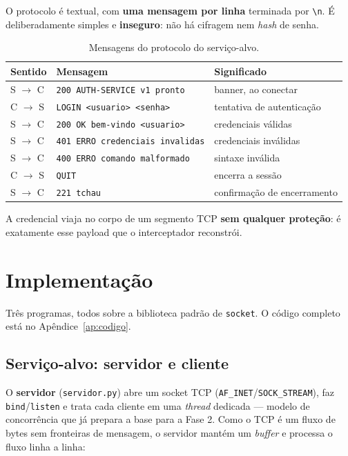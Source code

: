 \documentclass[11pt,a4paper]{article}
\begin{document}
O protocolo é textual, com \textbf{uma mensagem por linha} terminada por
\texttt{\textbackslash n}. É deliberadamente simples e \textbf{inseguro}: não há
cifragem nem \textit{hash} de senha.

\begin{table}[h]
\centering
\begin{tabular}{@{}llp{6.8cm}@{}}
\toprule
\textbf{Sentido} & \textbf{Mensagem} & \textbf{Significado} \\
\midrule
S $\rightarrow$ C & \texttt{200 AUTH-SERVICE v1 pronto} & banner, ao conectar \\
C $\rightarrow$ S & \texttt{LOGIN <usuario> <senha>} & tentativa de autenticação \\
S $\rightarrow$ C & \texttt{200 OK bem-vindo <usuario>} & credenciais válidas \\
S $\rightarrow$ C & \texttt{401 ERRO credenciais invalidas} & credenciais inválidas \\
S $\rightarrow$ C & \texttt{400 ERRO comando malformado} & sintaxe inválida \\
C $\rightarrow$ S & \texttt{QUIT} & encerra a sessão \\
S $\rightarrow$ C & \texttt{221 tchau} & confirmação de encerramento \\
\bottomrule
\end{tabular}
\caption{Mensagens do protocolo do serviço-alvo.}
\label{tab:protocolo}
\end{table}

A credencial viaja no corpo de um segmento TCP \textbf{sem qualquer proteção}: é
exatamente esse payload que o interceptador reconstrói.

\section{Implementação}

Três programas, todos sobre a biblioteca padrão de \texttt{socket}. O código
completo está no Apêndice~\ref{ap:codigo}.

\subsection{Serviço-alvo: servidor e cliente}

O \textbf{servidor} (\texttt{servidor.py}) abre um socket TCP
(\texttt{AF\_INET}/\texttt{SOCK\_STREAM}), faz \texttt{bind}/\texttt{listen} e
trata cada cliente em uma \textit{thread} dedicada — modelo de concorrência que
já prepara a base para a Fase 2. Como o TCP é um fluxo de bytes sem fronteiras de
mensagem, o servidor mantém um \textit{buffer} e processa o fluxo linha a linha:
\end{document}

